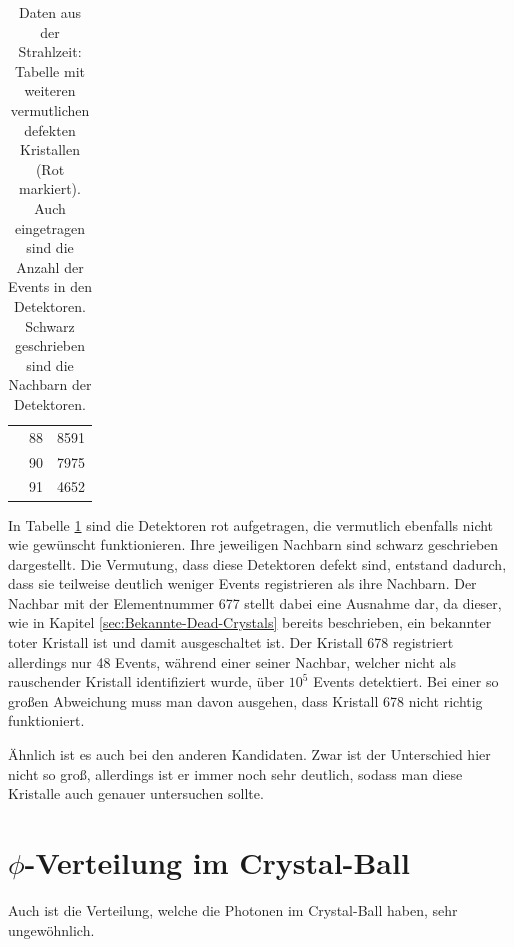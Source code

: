 \documentclass[a4paper,11pt,oneside,final,german,openbib,pdftex]{scrbook}
\begin{document}
{\begin{table}[h!]
\begin{center}
\begin{tabular}{lcc}
 	& 88& 8591\\
 	
 	&90&7975 \\
 	
 	&91&4652 \\
 	
 	
 	
 	\end{tabular}
 \caption[Vermutete defekte Kristalle und ihre Nachbarn mit Anzahl ihrer Events]{Daten aus der Strahlzeit: Tabelle mit weiteren vermutlichen defekten Kristallen (Rot markiert). Auch eingetragen sind die Anzahl der Events in den Detektoren. Schwarz geschrieben sind die Nachbarn der Detektoren.}
\label{tab:Vermutete-Dead-Crystals} 
\end{center}
 \end{table}
 
 In Tabelle \ref{tab:Vermutete-Dead-Crystals} sind die Detektoren rot aufgetragen, die vermutlich ebenfalls nicht wie gew\"unscht funktionieren. Ihre jeweiligen Nachbarn sind schwarz geschrieben dargestellt. Die Vermutung, dass diese Detektoren defekt sind, entstand dadurch, dass sie teilweise deutlich weniger Events registrieren als ihre Nachbarn. Der Nachbar mit der Elementnummer 677 stellt dabei eine Ausnahme dar, da dieser, wie in Kapitel \ref{sec:Bekannte-Dead-Crystals} bereits beschrieben, ein bekannter toter Kristall ist und damit ausgeschaltet ist. Der Kristall 678 registriert allerdings nur 48 Events, w\"ahrend einer seiner Nachbar, welcher nicht als rauschender Kristall identifiziert wurde, \"uber $10^5$ Events detektiert. Bei einer so gro{\ss}en Abweichung muss man davon ausgehen, dass Kristall 678 nicht richtig funktioniert.  
 
 \"Ahnlich ist es auch bei den anderen Kandidaten. Zwar ist der Unterschied hier nicht so gro{\ss}, allerdings ist er immer noch sehr deutlich, sodass man diese Kristalle auch genauer untersuchen sollte.


\section{$\phi$-Verteilung im Crystal-Ball}

Auch ist die Verteilung, welche die Photonen im Crystal-Ball haben, sehr ungew\"ohnlich.

}
\end{document}

